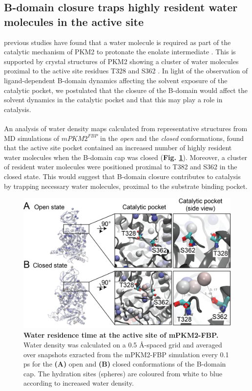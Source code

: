 \subsection{B-domain closure traps highly resident water molecules in the active site}
previous studies have found that a water molecule is required as part of the catalytic mechanism of PKM2 to protonate the enolate intermediate \cite{Hollenberg:1971aa}. This is supported by crystal structures of PKM2 showing a cluster of water molecules proximal to the active site residues T328 and S362 \cite{Christofk:2008aa,Dombrauckas:2005aa}. In light of the observation of ligand-dependent B-domain dynamics affecting the solvent exposure of the catalytic pocket, we postulated that the closure of the B-domain would affect the solvent dynamics in the catalytic pocket and that this may play a role in catalysis. 
%
%
\\\\
%
%
An analysis of water density maps \cite{Fornili:2012aa} calculated from representative structures from MD simulations of $mPKM2^{FBP}$ in the \textit{open} and the \textit{closed} conformations, found that the active site pocket contained an increased number of highly resident water molecules when the B-domain cap was closed (\textbf{Fig. \ref{fig:monomer_water_residence}}). Moreover, a cluster of resident water molecules were positioned proximal to T382 and S362 in the closed state. This would suggest that B-domain closure contributes to catalysis by trapping necessary water molecules, proximal to the substrate binding pocket. 
%
%
%
%
%
\begin{figure}[!ht]
\includegraphics[scale=0.6]{ch6_fig5_active_site_water.png}
\caption[Water residence time at the active site of mPKM2-FBP.]{\textbf{Water residence time at the active site of mPKM2-FBP.} Water density was calculated on a 0.5 \AA -spaced grid and averaged over snapshots exracted from the mPKM2-FBP simulation every 0.1 ps for the \textbf{(A)} open and \textbf{(B)} closed conformations of the B-domain cap. The hydration sites (spheres) are coloured from white to blue according to increased water density.}
\label{fig:monomer_water_residence}
\end{figure}

